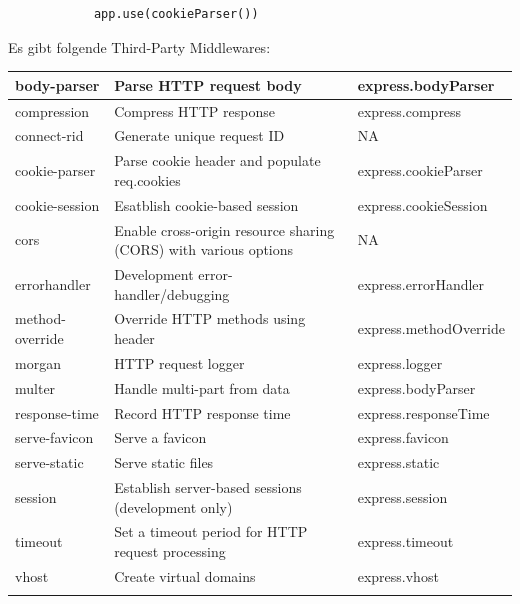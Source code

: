 \begin{itemize}
\begin{lstlisting}
            app.use(cookieParser())
        \end{lstlisting}
        Es gibt folgende Third-Party Middlewares:\newline
        \begin{tabularx}{0.8\textwidth} { 
            | >{\raggedright\arraybackslash}X 
            | >{\centering\arraybackslash}X 
            | >{\raggedleft\arraybackslash}X | }
        \hline
            body-parser & Parse HTTP request body & express.bodyParser \\
        \hline
            compression & Compress HTTP response & express.compress \\
        \hline
            connect-rid & Generate unique request ID & NA \\
        \hline
            cookie-parser & Parse cookie header and populate req.cookies & express.cookieParser \\
        \hline
            cookie-session & Esatblish cookie-based session & express.cookieSession \\
        \hline
            cors & Enable cross-origin resource sharing (CORS) with various options & NA \\
        \hline
            errorhandler & Development error-handler/debugging & express.errorHandler \\
        \hline
            method-override & Override HTTP methods using header & express.methodOverride \\
        \hline
            morgan & HTTP request logger & express.logger \\
        \hline
            multer & Handle multi-part from data & express.bodyParser \\
        \hline
            response-time & Record HTTP response time & express.responseTime \\
        \hline
            serve-favicon & Serve a favicon & express.favicon \\
        \hline
            serve-static & Serve static files & express.static \\
        \hline
            session & Establish server-based sessions (development only) & express.session \\
        \hline
            timeout & Set a timeout period for HTTP request processing & express.timeout \\
        \hline
            vhost & Create virtual domains & express.vhost \\
        \hline
        \cite{Express_js_third_party_middlewares}
        \end{tabularx}
\end{itemize}
\cite{Express_js_writing_middleware}
\cite{Express_js_using_middleware}
\cite{Express_js_middleware_help_1}

